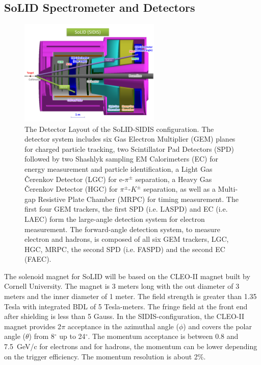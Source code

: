 \subsection {SoLID Spectrometer and Detectors} 
\begin{figure}[!ht]
 \begin{center}
  \includegraphics[width=0.6\textwidth]{./figures/SoLID_SIDIS_setup.pdf}
   \caption[The Detector Layout of the SoLID-SIDIS
     configuration]{\footnotesize{The Detector Layout of the SoLID-SIDIS
       configuration. The detector system includes six Gas Electron Multiplier
       (GEM) planes for charged particle tracking, two Scintillator Pad
       Detectors (SPD) followed by two Shashlyk sampling EM Calorimeters (EC)
       for energy measurement and particle identification, a Light Gas
       \v{C}erenkov Detector (LGC) for e-$\pi^{\pm}$ separation, a Heavy Gas
       \v{C}erenkov Detector (HGC) for $\pi^{\pm}$-$K^{\pm}$ separation, as
       well as a Multi-gap Resistive Plate Chamber (MRPC) for timing
       measurement. The first four GEM trackers, the first SPD (i.e. LASPD) and
       EC (i.e. LAEC) form the large-angle detection system for electron
       measurement. The forward-angle detection system, to measure electron and
       hadrons, is composed of all six GEM trackers, LGC, HGC, MRPC, the second
       SPD (i.e. FASPD) and the second EC (FAEC).}}
   \label{solid_sidis}
 \end{center}
\end{figure}
The solenoid magnet for SoLID will be based on the CLEO-II magnet built by
Cornell University. The magnet is 3 meters long with the out diameter of 3
meters and the inner diameter of 1 meter. The field strength is greater than
1.35 Tesla with integrated BDL of 5 Tesla-meters. The fringe field at the front
end after shielding is less than 5 Gauss. In the SIDIS-configuration, the
CLEO-II magnet provides 2$\pi$ acceptance in the azimuthal angle ($\phi$) and
covers the polar angle ($\theta$) from 8$^{\circ}$ up to 24$^{\circ}$. The
momentum acceptance is between 0.8 and 7.5~GeV/c for electrons and for hadrons, 
the momentum can be lower depending on the trigger efficiency.  The momentum resolution is
about 2\%.

